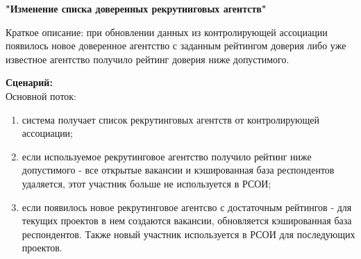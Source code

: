 \textbf{"Изменение списка доверенных рекрутинговых агентств"}

Краткое описание: при обновлении данных из контролирующей ассоциации появилось новое доверенное агентство с заданным рейтингом доверия либо уже известное агентство получило рейтинг доверия ниже допустимого.

\textbf{Сценарий:}\\
Основной поток:
\begin{enumerate}
\item система получает список рекрутинговых агентств от контролирующей ассоциации;
\item если используемое рекрутинговое агентство получило рейтинг ниже допустимого - все открытые вакансии и кэшированная база респондентов удаляется, этот участник больше не используется в РСОИ;
\item если появилось новое рекрутинговое агентсво с достаточным рейтингов - для текущих проектов в нем создаются вакансии, обновляется кэшированная база респондентов. Также новый участник используется в РСОИ для последующих проектов.
\end{enumerate}

